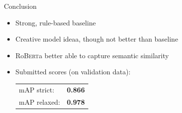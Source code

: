 \documentclass[english,handout]{mlutalk}
\newcommand{\Roberta}{\mbox{Ro\textsc{Bert}a}\xspace}
\begin{document}
\begin{frame}{Conclusion}
  \begin{itemize}
    \item Strong, rule-based baseline
    \item Creative model ideaa, though not better than baseline
    \item \Roberta better able to capture semantic similarity
    \item Submitted scores (on validation data): \\
    \begin{tabular}{@{}lc}
      mAP strict: & \textbf{0.866} \\
      mAP relaxed: & \textbf{0.978}
    \end{tabular}
  \end{itemize}
\end{frame}

\appendix
\section{\appendixname}

\bibliographyframe
\end{document}
